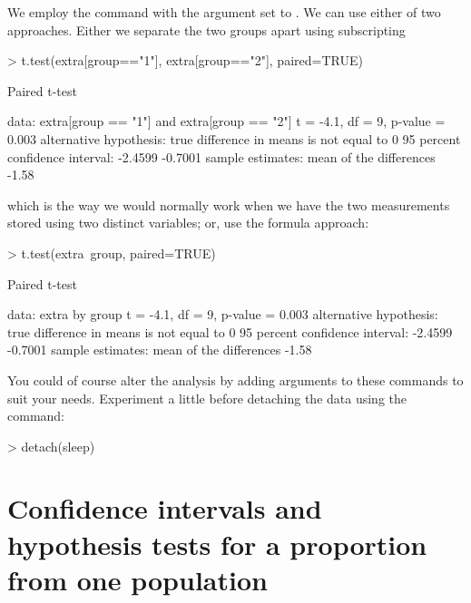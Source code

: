 We employ the  command with the  argument set to . We can use either of two approaches. Either we separate the two groups apart using subscripting
\begin{Schunk}
\begin{Sinput}
> t.test(extra[group=="1"], extra[group=="2"], paired=TRUE)
\end{Sinput}
\begin{Soutput}

	Paired t-test

data:  extra[group == "1"] and extra[group == "2"]
t = -4.1, df = 9, p-value = 0.003
alternative hypothesis: true difference in means is not equal to 0
95 percent confidence interval:
 -2.4599 -0.7001
sample estimates:
mean of the differences 
                  -1.58 
\end{Soutput}
\end{Schunk}

which is the way we would normally work when we have the two measurements stored using two distinct variables; or, use the formula approach:
\begin{Schunk}
\begin{Sinput}
> t.test(extra~group, paired=TRUE)
\end{Sinput}
\begin{Soutput}

	Paired t-test

data:  extra by group
t = -4.1, df = 9, p-value = 0.003
alternative hypothesis: true difference in means is not equal to 0
95 percent confidence interval:
 -2.4599 -0.7001
sample estimates:
mean of the differences 
                  -1.58 
\end{Soutput}
\end{Schunk}

You could of course alter the analysis by adding arguments to these commands to suit your needs. Experiment a little before detaching the  data using the  command:
\begin{Schunk}
\begin{Sinput}
> detach(sleep)
\end{Sinput}
\end{Schunk}


\section{Confidence intervals and hypothesis tests for a proportion from one population}


